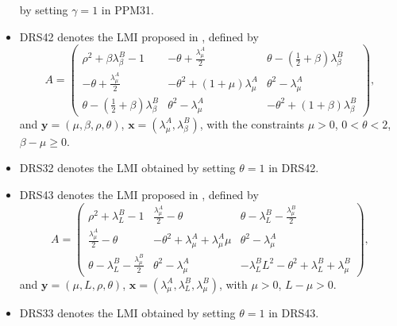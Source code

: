 \documentclass[nonacm]{acmart}
\newcommand{\x}{\bm{x}}
\newcommand{\y}{\bm{y}}
\begin{document}
\begin{itemize}
          by setting $\gamma=1$ in \textsf{PPM31}.
    \item \textsf{DRS42} denotes the LMI proposed in
          \cite[SM3.1.1.]{ryu2020operator},
          defined by
          \begin{equation*}
              A=
              \begin{pmatrix}
                  \rho^2+\beta\lambda_\beta^B-1             & -\theta+\frac{\lambda^A_\mu}{2} & \theta-(\frac{1}{2}+\beta)\lambda_\beta^B \\
                  -\theta+\frac{\lambda^A_\mu}{2}           & -\theta^2+(1+\mu)\lambda^A_\mu  & \theta^2-\lambda^A_\mu                    \\
                  \theta-(\frac{1}{2}+\beta)\lambda_\beta^B & \theta^2-\lambda^A_\mu          & -\theta^2+(1+\beta)\lambda_\beta^B
              \end{pmatrix},
          \end{equation*}
          and $\y=(\mu,\beta,\rho,\theta)$,
          $\x=(\lambda^A_\mu,\lambda_\beta^B)$,
          with the constraints $\mu>0$, $0<\theta<2$, $\beta-\mu\geq 0$.
    \item \textsf{DRS32} denotes the LMI obtained
          by setting $\theta=1$ in \textsf{DRS42}.
    \item \textsf{DRS43} denotes the LMI proposed in
          \cite[SM3.2.2.]{ryu2020operator}, defined by
          \begin{equation*}
              A=
              \begin{pmatrix}
                  \rho^2+\lambda^B_L-1                       & \frac{\lambda^A_\mu}{2}-\theta            & \theta-\lambda^B_L-\frac{\lambda^B_\mu}{2}          \\
                  \frac{\lambda^A_\mu}{2}-\theta             & -\theta^2+\lambda^A_\mu+\lambda^A_\mu \mu & \theta^2-\lambda^A_\mu                              \\
                  \theta-\lambda^B_L-\frac{\lambda^B_\mu}{2} & \theta^2-\lambda^A_\mu                    & -\lambda^B_L L^2-\theta^2+\lambda^B_L+\lambda^B_\mu
              \end{pmatrix},
          \end{equation*}
          and $\y=(\mu,L,\rho,\theta)$,
          $\x=(\lambda^A_\mu,\lambda^B_L,\lambda^B_\mu)$,
          with $\mu>0$, $L-\mu>0$.
    \item \textsf{DRS33} denotes the LMI obtained
          by setting $\theta=1$ in \textsf{DRS43}.
\end{itemize}



\end{document}
